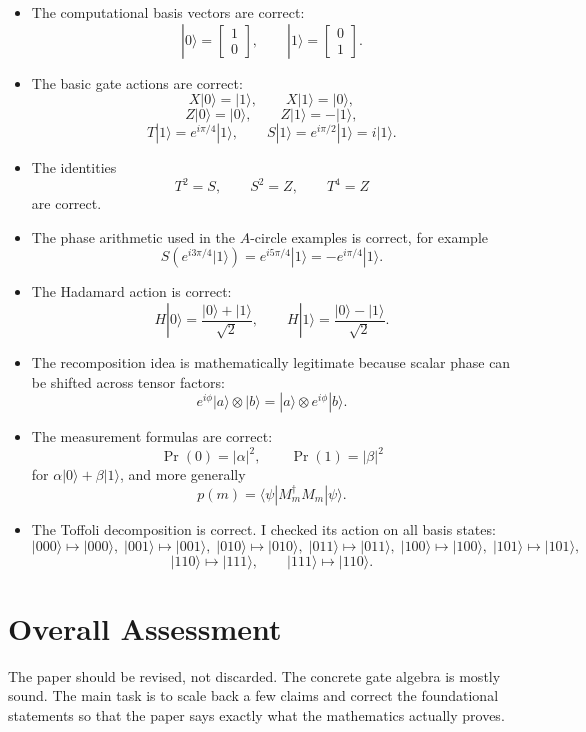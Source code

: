 \documentclass[11pt]{article}
\begin{document}
\begin{itemize}
\item The computational basis vectors are correct:
\[
|0\rangle=\begin{bmatrix}1\\0\end{bmatrix},
\qquad
|1\rangle=\begin{bmatrix}0\\1\end{bmatrix}.
\]

\item The basic gate actions are correct:
\[
X|0\rangle=|1\rangle, \qquad X|1\rangle=|0\rangle,
\]
\[
Z|0\rangle=|0\rangle, \qquad Z|1\rangle=-|1\rangle,
\]
\[
T|1\rangle=e^{i\pi/4}|1\rangle, \qquad S|1\rangle=e^{i\pi/2}|1\rangle=i|1\rangle.
\]

\item The identities
\[
T^2=S, \qquad S^2=Z, \qquad T^4=Z
\]
are correct.

\item The phase arithmetic used in the \(A\)-circle examples is correct, for example
\[
S\!\left(e^{i3\pi/4}|1\rangle\right)=e^{i5\pi/4}|1\rangle=-e^{i\pi/4}|1\rangle.
\]

\item The Hadamard action is correct:
\[
H|0\rangle=\frac{|0\rangle+|1\rangle}{\sqrt2},
\qquad
H|1\rangle=\frac{|0\rangle-|1\rangle}{\sqrt2}.
\]

\item The recomposition idea is mathematically legitimate because scalar phase can be shifted across tensor factors:
\[
e^{i\phi}|a\rangle\otimes|b\rangle
=
|a\rangle\otimes e^{i\phi}|b\rangle.
\]

\item The measurement formulas are correct:
\[
\Pr(0)=|\alpha|^2, \qquad \Pr(1)=|\beta|^2
\]
for \(\alpha|0\rangle+\beta|1\rangle\), and more generally
\[
p(m)=\langle\psi|M_m^\dagger M_m|\psi\rangle.
\]

\item The Toffoli decomposition is correct. I checked its action on all basis states:
\[
|000\rangle\mapsto|000\rangle,\;
|001\rangle\mapsto|001\rangle,\;
|010\rangle\mapsto|010\rangle,\;
|011\rangle\mapsto|011\rangle,\;
|100\rangle\mapsto|100\rangle,\;
|101\rangle\mapsto|101\rangle,
\]
\[
|110\rangle\mapsto|111\rangle,
\qquad
|111\rangle\mapsto|110\rangle.
\]
\end{itemize}

\section*{Overall Assessment}

The paper should be revised, not discarded. The concrete gate algebra is mostly sound. The main task is to scale back a few claims and correct the foundational statements so that the paper says exactly what the mathematics actually proves.
\end{document}

